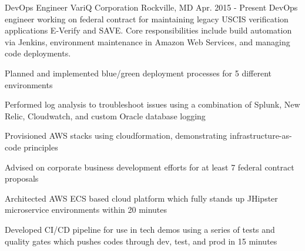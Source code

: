 

\begin{cventries}

  \cventrysix
    {DevOps Engineer} %
    {VariQ Corporation} %
    {Rockville, MD} %
    {Apr. 2015 - Present} %
    {DevOps engineer working on federal contract for maintaining legacy USCIS verification applications E-Verify and SAVE. Core responsibilities include build automation via Jenkins, environment maintenance in Amazon Web Services, and managing code deployments.} %
    {
      \begin{cvitems} %
        \item {Planned and implemented blue/green deployment processes for 5 different environments}
        \item {Performed log analysis to troubleshoot issues using a combination of Splunk, New Relic, Cloudwatch, and custom Oracle database logging}
        \item {Provisioned AWS stacks using cloudformation, demonstrating infrastructure-as-code principles}
        \item {Advised on corporate business development efforts for at least 7 federal contract proposals}
        \item {Architected AWS ECS based cloud platform which fully stands up JHipster microservice environments within 20 minutes}
        \item {Developed CI/CD pipeline for use in tech demos using a series of tests and quality gates which pushes codes through dev, test, and prod in 15 minutes}

\end{cvitems}}
\end{cventries}
